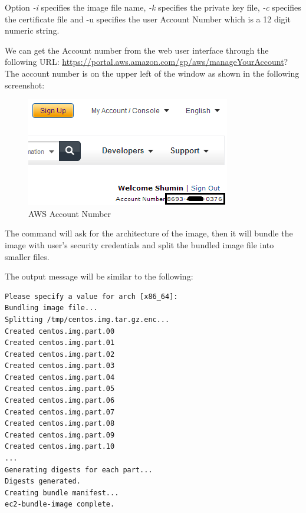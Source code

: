 Option \emph{-i} specifies the image file name, \emph{-k} specifies the private key file, \emph{-c} specifies the certificate file and -u specifies the user Account Number which is a 12 digit numeric string.

We can get the Account number from the web user interface through the following URL: \url{https://portal.aws.amazon.com/gp/aws/manageYourAccount}? The account number is on the upper left of the window as shown in the following screenshot:
\begin{figure}[ht]
  \centering
  \includegraphics[width=.56\textwidth]{figs/5163os_08_16.png}
  \caption{AWS Account Number}\label{fig:aws.account.number}
\end{figure} 
The command will ask for the architecture of the image, then it will bundle the image with user's security credentials and split the bundled image file into smaller files.

The output message will be similar to the following:
\lstset{style=bashstyle}
\begin{lstlisting}
Please specify a value for arch [x86_64]:
Bundling image file...
Splitting /tmp/centos.img.tar.gz.enc...
Created centos.img.part.00
Created centos.img.part.01
Created centos.img.part.02
Created centos.img.part.03
Created centos.img.part.04
Created centos.img.part.05
Created centos.img.part.06
Created centos.img.part.07
Created centos.img.part.08
Created centos.img.part.09
Created centos.img.part.10
...
Generating digests for each part...
Digests generated.
Creating bundle manifest...
ec2-bundle-image complete.
\end{lstlisting}

